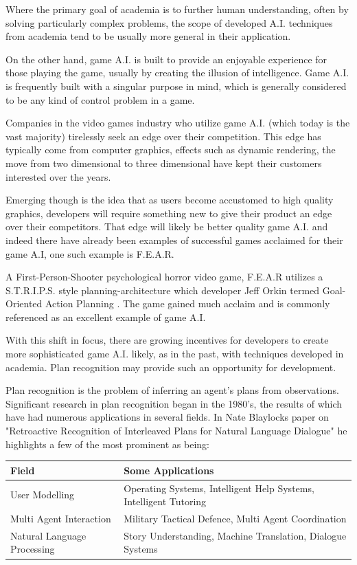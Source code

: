 \documentclass[parskip]{cs4rep}
\begin{document}
Where the primary goal of academia is to further human understanding, often by solving particularly complex problems, the scope of developed A.I. techniques from academia tend to be usually more general in their application.

On the other hand, game A.I. is built to provide an enjoyable experience for those playing the game, usually by creating the illusion of intelligence. Game A.I. is frequently built with a singular purpose in mind, which is generally considered to be any kind of control problem in a game.

Companies in the video games industry who utilize game A.I. (which today is the vast majority) tirelessly seek an edge over their competition. This edge has typically come from computer graphics, effects such as dynamic rendering, the move from two dimensional to three dimensional have kept their customers interested over the years. 

Emerging though is the idea that as users become accustomed to high quality graphics, developers will require something new to give their product an edge over their competitors. That edge will likely be better quality game A.I. and indeed there have already been examples of successful games acclaimed for their game A.I, one such example is F.E.A.R. 

A First-Person-Shooter psychological horror video game, F.E.A.R utilizes a S.T.R.I.P.S. style planning-architecture which developer Jeff Orkin termed Goal-Oriented Action Planning \cite{citeulike:5386647}. The game gained much acclaim and is commonly referenced as an excellent example of game A.I.

With this shift in focus, there are growing incentives for developers to create more sophisticated game A.I. likely, as in the past, with techniques developed in academia. Plan recognition may provide such an opportunity for development. 

Plan recognition is the problem of inferring an agent's plans from observations. Significant research in plan recognition began in the 1980's, the results of which have had numerous applications in several fields. In Nate Blaylocks paper on "Retroactive Recognition of Interleaved Plans for Natural Language Dialogue" \cite{oai:CiteSeerPSU:538953} he highlights a few of the most prominent as being:

\begin{tabular}{|l|p{8cm}|}
\hline 
\textbf{Field} & \textbf{Some Applications} \\ 
\hline 
User Modelling & Operating Systems, Intelligent Help Systems, Intelligent Tutoring \\ 
\hline 
Multi Agent Interaction & Military Tactical Defence, Multi Agent Coordination \\ 
\hline 
Natural Language Processing & Story Understanding, Machine Translation, Dialogue Systems \\ 
\hline
\end{tabular} 
\end{document}
